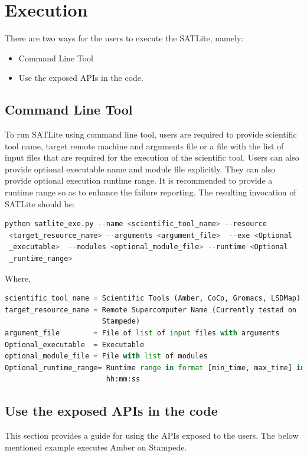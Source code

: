 \documentclass[10pt]{ruthesis}
\begin{document}
\section{Execution}
There are two ways for the users to execute the SATLite, namely:
\begin{itemize}
\item Command Line Tool
\item Use the exposed APIs in the code.
\end{itemize}

\subsection{Command Line Tool}
To run SATLite using command line tool, users are required to provide scientific tool name, target remote machine and arguments file or a file with the list of input files that are required for the execution of the scientific tool. Users can also provide optional executable name and module file explicitly. They can also provide optional execution runtime range. It is recommended to provide a runtime range so as to enhance the failure reporting. The resulting invocation of SATLite should be:

\begin{lstlisting}[language=Python, linewidth=16cm]
 python satlite_exe.py --name <scientific_tool_name> --resource 
 <target_resource_name> --arguments <argument_file>  --exe <Optional
 _executable>  --modules <optional_module_file> --runtime <Optional
 _runtime_range>
\end{lstlisting}

Where,
\begin{lstlisting}[language=Python, linewidth=16cm]
scientific_tool_name = Scientific Tools (Amber, CoCo, Gromacs, LSDMap)
target_resource_name = Remote Supercomputer Name (Currently tested on 
                       Stampede)
argument_file        = File of list of input files with arguments
Optional_executable  = Executable
optional_module_file = File with list of modules
Optional_runtime_range= Runtime range in format [min_time, max_time] in
                        hh:mm:ss
\end{lstlisting}

\subsection{Use the exposed APIs in the code}
This section provides a guide for using the APIs exposed to the users. The below mentioned example executes Amber on Stampede.
\end{document}
